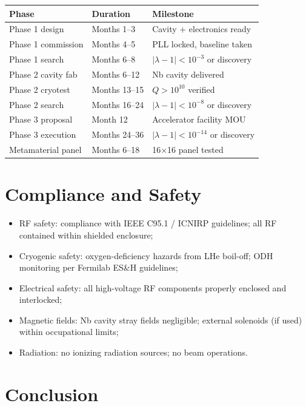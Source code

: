 \documentclass[12pt,letterpaper]{article}
\begin{document}
\begin{center}
\begin{tabular}{lll}
\toprule
Phase & Duration & Milestone \\
\midrule
Phase 1 design & Months 1--3 & Cavity + electronics ready \\
Phase 1 commission & Months 4--5 & PLL locked, baseline taken \\
Phase 1 search & Months 6--8 & $|\lambda-1| < 10^{-3}$ or discovery \\
Phase 2 cavity fab & Months 6--12 & Nb cavity delivered \\
Phase 2 cryotest & Months 13--15 & $Q > 10^{10}$ verified \\
Phase 2 search & Months 16--24 & $|\lambda-1| < 10^{-8}$ or discovery \\
Phase 3 proposal & Month 12 & Accelerator facility MOU \\
Phase 3 execution & Months 24--36 & $|\lambda-1| < 10^{-14}$ or discovery \\
Metamaterial panel & Months 6--18 & 16$\times$16 panel tested \\
\bottomrule
\end{tabular}
\end{center}

\section{Compliance and Safety}

\begin{itemize}[noitemsep]
  \item RF safety: compliance with IEEE C95.1 / ICNIRP guidelines;
    all RF contained within shielded enclosure;
  \item Cryogenic safety: oxygen-deficiency hazards from LHe boil-off;
    ODH monitoring per Fermilab ES\&H guidelines;
  \item Electrical safety: all high-voltage RF components properly
    enclosed and interlocked;
  \item Magnetic fields: Nb cavity stray fields negligible;
    external solenoids (if used) within occupational limits;
  \item Radiation: no ionizing radiation sources; no beam operations.
\end{itemize}

\section{Conclusion}
\end{document}
